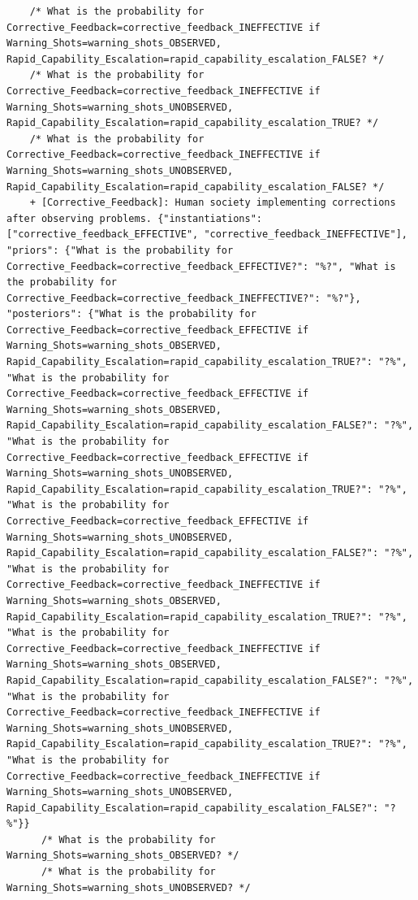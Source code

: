 \documentclass[
  11pt,
  letterpaper,
]{book}
\begin{document}
\begin{verbatim}
    /* What is the probability for Corrective_Feedback=corrective_feedback_INEFFECTIVE if Warning_Shots=warning_shots_OBSERVED, Rapid_Capability_Escalation=rapid_capability_escalation_FALSE? */
    /* What is the probability for Corrective_Feedback=corrective_feedback_INEFFECTIVE if Warning_Shots=warning_shots_UNOBSERVED, Rapid_Capability_Escalation=rapid_capability_escalation_TRUE? */
    /* What is the probability for Corrective_Feedback=corrective_feedback_INEFFECTIVE if Warning_Shots=warning_shots_UNOBSERVED, Rapid_Capability_Escalation=rapid_capability_escalation_FALSE? */
    + [Corrective_Feedback]: Human society implementing corrections after observing problems. {"instantiations": ["corrective_feedback_EFFECTIVE", "corrective_feedback_INEFFECTIVE"], "priors": {"What is the probability for Corrective_Feedback=corrective_feedback_EFFECTIVE?": "%?", "What is the probability for Corrective_Feedback=corrective_feedback_INEFFECTIVE?": "%?"}, "posteriors": {"What is the probability for Corrective_Feedback=corrective_feedback_EFFECTIVE if Warning_Shots=warning_shots_OBSERVED, Rapid_Capability_Escalation=rapid_capability_escalation_TRUE?": "?%", "What is the probability for Corrective_Feedback=corrective_feedback_EFFECTIVE if Warning_Shots=warning_shots_OBSERVED, Rapid_Capability_Escalation=rapid_capability_escalation_FALSE?": "?%", "What is the probability for Corrective_Feedback=corrective_feedback_EFFECTIVE if Warning_Shots=warning_shots_UNOBSERVED, Rapid_Capability_Escalation=rapid_capability_escalation_TRUE?": "?%", "What is the probability for Corrective_Feedback=corrective_feedback_EFFECTIVE if Warning_Shots=warning_shots_UNOBSERVED, Rapid_Capability_Escalation=rapid_capability_escalation_FALSE?": "?%", "What is the probability for Corrective_Feedback=corrective_feedback_INEFFECTIVE if Warning_Shots=warning_shots_OBSERVED, Rapid_Capability_Escalation=rapid_capability_escalation_TRUE?": "?%", "What is the probability for Corrective_Feedback=corrective_feedback_INEFFECTIVE if Warning_Shots=warning_shots_OBSERVED, Rapid_Capability_Escalation=rapid_capability_escalation_FALSE?": "?%", "What is the probability for Corrective_Feedback=corrective_feedback_INEFFECTIVE if Warning_Shots=warning_shots_UNOBSERVED, Rapid_Capability_Escalation=rapid_capability_escalation_TRUE?": "?%", "What is the probability for Corrective_Feedback=corrective_feedback_INEFFECTIVE if Warning_Shots=warning_shots_UNOBSERVED, Rapid_Capability_Escalation=rapid_capability_escalation_FALSE?": "?%"}}
      /* What is the probability for Warning_Shots=warning_shots_OBSERVED? */
      /* What is the probability for Warning_Shots=warning_shots_UNOBSERVED? */

\end{verbatim}
\end{document}
